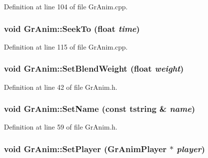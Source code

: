 Definition at line 104 of file GrAnim.cpp.\hypertarget{class_gr_anim_7aa48461719836a8a2ad7ffff67a958c}{
\subsubsection[{SeekTo}]{\setlength{\rightskip}{0pt plus 5cm}void GrAnim::SeekTo (float {\em time})}}
\label{class_gr_anim_7aa48461719836a8a2ad7ffff67a958c}




Definition at line 115 of file GrAnim.cpp.\hypertarget{class_gr_anim_6e433bc1fcdaea899f78bd51f2e0ffa7}{
\subsubsection[{SetBlendWeight}]{\setlength{\rightskip}{0pt plus 5cm}void GrAnim::SetBlendWeight (float {\em weight})}}
\label{class_gr_anim_6e433bc1fcdaea899f78bd51f2e0ffa7}




Definition at line 42 of file GrAnim.h.\hypertarget{class_gr_anim_3f5d565461de134898fad1dcfc04c17a}{
\subsubsection[{SetName}]{\setlength{\rightskip}{0pt plus 5cm}void GrAnim::SetName (const {\bf tstring} \& {\em name})}}
\label{class_gr_anim_3f5d565461de134898fad1dcfc04c17a}




Definition at line 59 of file GrAnim.h.\hypertarget{class_gr_anim_d3ec0402580565cd063b139be74c2337}{
\subsubsection[{SetPlayer}]{\setlength{\rightskip}{0pt plus 5cm}void GrAnim::SetPlayer ({\bf GrAnimPlayer} $\ast$ {\em player})}}
\label{class_gr_anim_d3ec0402580565cd063b139be74c2337}




